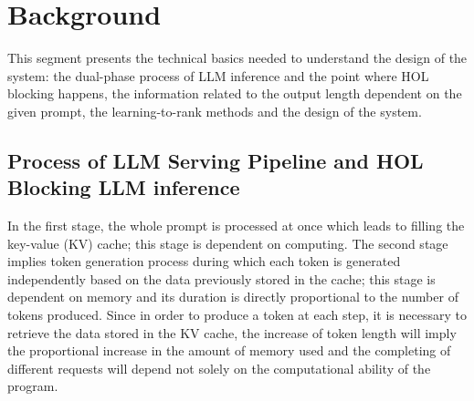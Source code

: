 \documentclass[conference]{IEEEtran}
\begin{document}
\section{Background}
\label{sec:background}
This segment presents the technical basics needed to understand the design of the system: the dual-phase process of LLM inference and the point where HOL blocking happens, the information related to the output length dependent on the given prompt, the learning-to-rank methods and the design of the system.

\subsection{Process of LLM Serving Pipeline and HOL Blocking LLM inference}\label{sec:hol-blocking}

 In the first stage, the whole prompt is processed at once which leads to filling the key-value (KV) cache; this stage is dependent on computing. The second stage implies token generation process during which each token is generated independently based on the data previously stored in the cache; this stage is dependent on memory and its duration is directly proportional to the number of tokens produced. Since in order to produce a token at each step, it is necessary to retrieve the data stored in the KV cache, the increase of token length will imply the proportional increase in the amount of memory used and the completing of different requests will depend not solely on the computational ability of the program.
\end{document}
